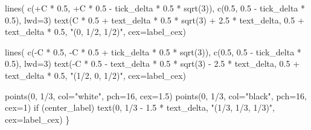 \documentclass[
  letterpaper,
  DIV=11,
  numbers=noendperiod]{scrartcl}
\newenvironment{Shaded}{\begin{snugshade}}{\end{snugshade}}
\newcommand{\AttributeTok}[1]{\textcolor[rgb]{0.40,0.45,0.13}{#1}}
\newcommand{\ControlFlowTok}[1]{\textcolor[rgb]{0.00,0.23,0.31}{#1}}
\newcommand{\DecValTok}[1]{\textcolor[rgb]{0.68,0.00,0.00}{#1}}
\newcommand{\FloatTok}[1]{\textcolor[rgb]{0.68,0.00,0.00}{#1}}
\newcommand{\FunctionTok}[1]{\textcolor[rgb]{0.28,0.35,0.67}{#1}}
\newcommand{\NormalTok}[1]{\textcolor[rgb]{0.00,0.23,0.31}{#1}}
\newcommand{\SpecialCharTok}[1]{\textcolor[rgb]{0.37,0.37,0.37}{#1}}
\newcommand{\StringTok}[1]{\textcolor[rgb]{0.13,0.47,0.30}{#1}}
\begin{document}
\begin{Shaded}
\begin{Highlighting}[]
  \FunctionTok{lines}\NormalTok{( }\FunctionTok{c}\NormalTok{(}\SpecialCharTok{+}\NormalTok{C }\SpecialCharTok{*} \FloatTok{0.5}\NormalTok{, }\SpecialCharTok{+}\NormalTok{C }\SpecialCharTok{*} \FloatTok{0.5} \SpecialCharTok{{-}}\NormalTok{ tick\_delta }\SpecialCharTok{*} \FloatTok{0.5} \SpecialCharTok{*} \FunctionTok{sqrt}\NormalTok{(}\DecValTok{3}\NormalTok{)),}
         \FunctionTok{c}\NormalTok{(}\FloatTok{0.5}\NormalTok{, }\FloatTok{0.5} \SpecialCharTok{{-}}\NormalTok{ tick\_delta }\SpecialCharTok{*} \FloatTok{0.5}\NormalTok{), }\AttributeTok{lwd=}\DecValTok{3}\NormalTok{)}
  \FunctionTok{text}\NormalTok{(C }\SpecialCharTok{*} \FloatTok{0.5} \SpecialCharTok{+}\NormalTok{ text\_delta }\SpecialCharTok{*} \FloatTok{0.5} \SpecialCharTok{*} \FunctionTok{sqrt}\NormalTok{(}\DecValTok{3}\NormalTok{) }\SpecialCharTok{+} \FloatTok{2.5} \SpecialCharTok{*}\NormalTok{ text\_delta,}
       \FloatTok{0.5} \SpecialCharTok{+}\NormalTok{ text\_delta }\SpecialCharTok{*} \FloatTok{0.5}\NormalTok{, }\StringTok{"(0, 1/2, 1/2)"}\NormalTok{, }\AttributeTok{cex=}\NormalTok{label\_cex)}

  \FunctionTok{lines}\NormalTok{( }\FunctionTok{c}\NormalTok{(}\SpecialCharTok{{-}}\NormalTok{C }\SpecialCharTok{*} \FloatTok{0.5}\NormalTok{, }\SpecialCharTok{{-}}\NormalTok{C }\SpecialCharTok{*} \FloatTok{0.5} \SpecialCharTok{+}\NormalTok{ tick\_delta }\SpecialCharTok{*} \FloatTok{0.5} \SpecialCharTok{*} \FunctionTok{sqrt}\NormalTok{(}\DecValTok{3}\NormalTok{)),}
         \FunctionTok{c}\NormalTok{(}\FloatTok{0.5}\NormalTok{, }\FloatTok{0.5} \SpecialCharTok{{-}}\NormalTok{ tick\_delta }\SpecialCharTok{*} \FloatTok{0.5}\NormalTok{), }\AttributeTok{lwd=}\DecValTok{3}\NormalTok{)}
  \FunctionTok{text}\NormalTok{(}\SpecialCharTok{{-}}\NormalTok{C }\SpecialCharTok{*} \FloatTok{0.5} \SpecialCharTok{{-}}\NormalTok{ text\_delta }\SpecialCharTok{*} \FloatTok{0.5} \SpecialCharTok{*} \FunctionTok{sqrt}\NormalTok{(}\DecValTok{3}\NormalTok{) }\SpecialCharTok{{-}} \FloatTok{2.5} \SpecialCharTok{*}\NormalTok{ text\_delta,}
       \FloatTok{0.5} \SpecialCharTok{+}\NormalTok{ text\_delta }\SpecialCharTok{*} \FloatTok{0.5}\NormalTok{, }\StringTok{"(1/2, 0, 1/2)"}\NormalTok{, }\AttributeTok{cex=}\NormalTok{label\_cex)}

  \FunctionTok{points}\NormalTok{(}\DecValTok{0}\NormalTok{, }\DecValTok{1}\SpecialCharTok{/}\DecValTok{3}\NormalTok{, }\AttributeTok{col=}\StringTok{"white"}\NormalTok{, }\AttributeTok{pch=}\DecValTok{16}\NormalTok{, }\AttributeTok{cex=}\FloatTok{1.5}\NormalTok{)}
  \FunctionTok{points}\NormalTok{(}\DecValTok{0}\NormalTok{, }\DecValTok{1}\SpecialCharTok{/}\DecValTok{3}\NormalTok{, }\AttributeTok{col=}\StringTok{"black"}\NormalTok{, }\AttributeTok{pch=}\DecValTok{16}\NormalTok{, }\AttributeTok{cex=}\DecValTok{1}\NormalTok{)}
  \ControlFlowTok{if}\NormalTok{ (center\_label)}
    \FunctionTok{text}\NormalTok{(}\DecValTok{0}\NormalTok{, }\DecValTok{1}\SpecialCharTok{/}\DecValTok{3} \SpecialCharTok{{-}} \FloatTok{1.5} \SpecialCharTok{*}\NormalTok{ text\_delta, }\StringTok{"(1/3, 1/3, 1/3)"}\NormalTok{, }\AttributeTok{cex=}\NormalTok{label\_cex)}
\NormalTok{\}}
\end{Highlighting}
\end{Shaded}
\end{document}
